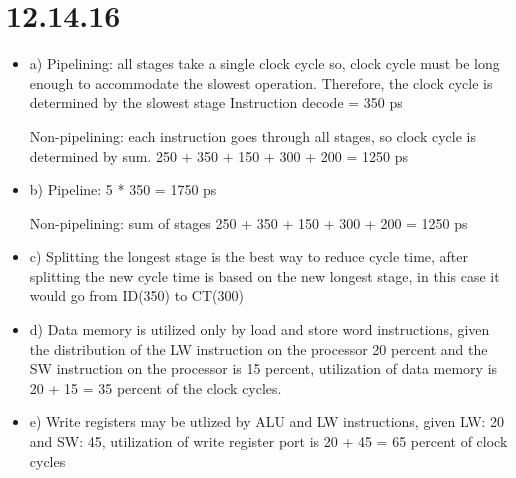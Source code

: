 \documentclass{article}
\begin{document}
\section{12.14.16}
\begin{itemize}
    \item a) Pipelining: all stages take a single clock cycle so, clock cycle must be long enough to accommodate the slowest operation. Therefore, the clock cycle is determined by the slowest stage Instruction decode = 350 ps \newline
    
    Non-pipelining: each instruction goes through all stages, so clock cycle is determined by sum. 250 + 350 + 150 + 300 + 200 = 1250 ps \newline
    
    \item b) Pipeline: 5 * 350 = 1750 ps\newline
    
    Non-pipelining: sum of stages 250 + 350 + 150 + 300 + 200 = 1250 ps \newline
    
    \item c) Splitting the longest stage is the best way to reduce cycle time, after splitting the new cycle time is based on the new longest stage, in this case it would go from ID(350) to CT(300) \newline
    
    \item d) Data memory is utilized only by load and store word instructions, given the distribution of the LW instruction on the processor 20 percent and the SW instruction on the processor is 15 percent, utilization of data memory is 20 + 15 = 35 percent of the clock cycles. \newline
    
    \item e) Write registers may be utlized by ALU and LW instructions, given LW: 20 and SW: 45, utilization of write register port is 20 + 45 = 65 percent of clock cycles \newline
\end{itemize}
\end{document}
